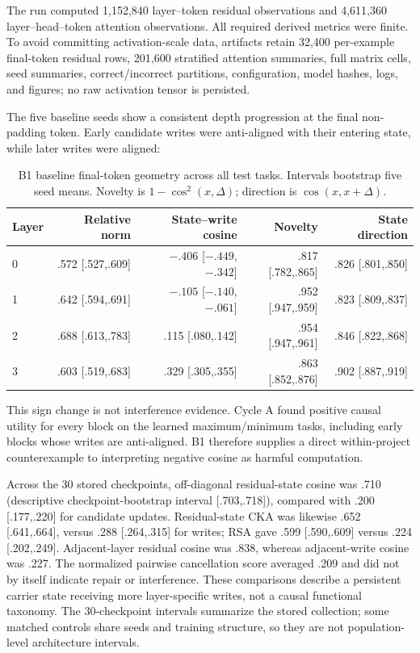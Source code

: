 \documentclass[10pt]{article}
\begin{document}
The run computed 1,152,840 layer--token residual observations and 4,611,360 layer--head--token attention observations. All required derived metrics were finite. To avoid committing activation-scale data, artifacts retain 32,400 per-example final-token residual rows, 201,600 stratified attention summaries, full matrix cells, seed summaries, correct/incorrect partitions, configuration, model hashes, logs, and figures; no raw activation tensor is persisted.

The five baseline seeds show a consistent depth progression at the final non-padding token. Early candidate writes were anti-aligned with their entering state, while later writes were aligned:
\begin{table}[ht]
\centering
\caption{B1 baseline final-token geometry across all test tasks. Intervals bootstrap five seed means. Novelty is $1-\cos^2(x,\Delta)$; direction is $\cos(x,x+\Delta)$.}
\begin{tabular}{lrrrr}
\toprule
Layer & Relative norm & State--write cosine & Novelty & State direction \\
\midrule
0 & .572 [.527,.609] & $-.406$ [$-.449$,$-.342$] & .817 [.782,.865] & .826 [.801,.850] \\
1 & .642 [.594,.691] & $-.105$ [$-.140$,$-.061$] & .952 [.947,.959] & .823 [.809,.837] \\
2 & .688 [.613,.783] & .115 [.080,.142] & .954 [.947,.961] & .846 [.822,.868] \\
3 & .603 [.519,.683] & .329 [.305,.355] & .863 [.852,.876] & .902 [.887,.919] \\
\bottomrule
\end{tabular}
\end{table}

This sign change is not interference evidence. Cycle A found positive causal utility for every block on the learned maximum/minimum tasks, including early blocks whose writes are anti-aligned. B1 therefore supplies a direct within-project counterexample to interpreting negative cosine as harmful computation.

Across the 30 stored checkpoints, off-diagonal residual-state cosine was .710 (descriptive checkpoint-bootstrap interval [.703,.718]), compared with .200 [.177,.220] for candidate updates. Residual-state CKA was likewise .652 [.641,.664], versus .288 [.264,.315] for writes; RSA gave .599 [.590,.609] versus .224 [.202,.249]. Adjacent-layer residual cosine was .838, whereas adjacent-write cosine was .227. The normalized pairwise cancellation score averaged .209 and did not by itself indicate repair or interference. These comparisons describe a persistent carrier state receiving more layer-specific writes, not a causal functional taxonomy. The 30-checkpoint intervals summarize the stored collection; some matched controls share seeds and training structure, so they are not population-level architecture intervals.
\end{document}
